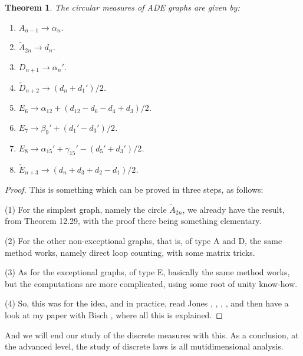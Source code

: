 \documentclass[12pt]{amsbook}
\newtheorem{theorem}{Theorem}[chapter]
\begin{document}
\begin{theorem}
The circular measures of ADE graphs are given by:
\begin{enumerate}
\item $A_{n-1}\to\alpha_n$.

\item $\tilde{A}_{2n}\to d_n$.

\item $D_{n+1}\to\alpha_n'$.

\item $\tilde{D}_{n+2}\to (d_n+d_1')/2$.

\item $E_6\to\alpha_{12}+(d_{12}-d_6-d_4+d_3)/2$.

\item $E_7\to\beta_9'+(d_1'-d_3')/2$.

\item $E_8\to\alpha_{15}'+\gamma_{15}'-(d_5'+d_3')/2$.

\item $\tilde{E}_{n+3}\to (d_n+d_3+d_2-d_1)/2$.
\end{enumerate}
\end{theorem}

\begin{proof}
This is something which can be proved in three steps, as follows:

\medskip

(1) For the simplest graph, namely the circle $\tilde{A}_{2n}$, we already have the result, from Theorem 12.29, with the proof there being something elementary.

\medskip

(2) For the other non-exceptional graphs, that is, of type A and D, the same method works, namely direct loop counting, with some matrix tricks.

\medskip

(3) As for the exceptional graphs, of type E, basically the same method works, but the computations are more complicated, using some root of unity know-how. 

\medskip

(4) So, this was for the idea, and in practice, read Jones \cite{jo1}, \cite{jo2}, \cite{jo3}, \cite{jo4}, and then have a look at my paper with Bisch \cite{bbi}, where all this is explained.
\end{proof}

And we will end our study of the discrete measures with this. As a conclusion, at the advanced level, the study of discrete laws is all mutidimensional analysis.
\end{document}
